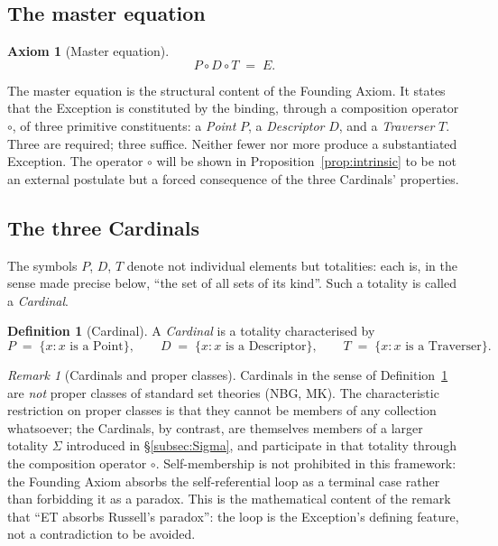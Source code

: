 \documentclass[11pt,a4paper]{article}
\theoremstyle{definition}
\newtheorem{definition}[theorem]{Definition}
\newtheorem{axiom}[theorem]{Axiom}
\theoremstyle{remark}
\newtheorem{remark}[theorem]{Remark}
\begin{document}
\subsection{The master equation}

\begin{axiom}[Master equation]\label{ax:master}
\[
\boxed{\;P \circ D \circ T \;=\; E.\;}
\]
\end{axiom}

The master equation is the structural content of the Founding Axiom. It states that the Exception is constituted by the binding, through a composition operator $\circ$, of three primitive constituents: a \emph{Point} $P$, a \emph{Descriptor} $D$, and a \emph{Traverser} $T$. Three are required; three suffice. Neither fewer nor more produce a substantiated Exception. The operator $\circ$ will be shown in Proposition~\ref{prop:intrinsic} to be not an external postulate but a forced consequence of the three Cardinals' properties.

\subsection{The three Cardinals}

The symbols $P$, $D$, $T$ denote not individual elements but totalities: each is, in the sense made precise below, ``the set of all sets of its kind''. Such a totality is called a \emph{Cardinal}.

\begin{definition}[Cardinal]\label{def:cardinal}
A \emph{Cardinal} is a totality characterised by
\[
P \;=\; \{x : x \text{ is a Point}\}, \qquad
D \;=\; \{x : x \text{ is a Descriptor}\}, \qquad
T \;=\; \{x : x \text{ is a Traverser}\}.
\]
\end{definition}

\begin{remark}[Cardinals and proper classes]\label{rem:propclass}
Cardinals in the sense of Definition~\ref{def:cardinal} are \emph{not} proper classes of standard set theories (NBG, MK). The characteristic restriction on proper classes is that they cannot be members of any collection whatsoever; the Cardinals, by contrast, are themselves members of a larger totality $\Sigma$ introduced in \S\ref{subsec:Sigma}, and participate in that totality through the composition operator $\circ$. Self-membership is not prohibited in this framework: the Founding Axiom absorbs the self-referential loop as a terminal case rather than forbidding it as a paradox. This is the mathematical content of the remark that ``ET absorbs Russell's paradox'': the loop is the Exception's defining feature, not a contradiction to be avoided.
\end{remark}
\end{document}
